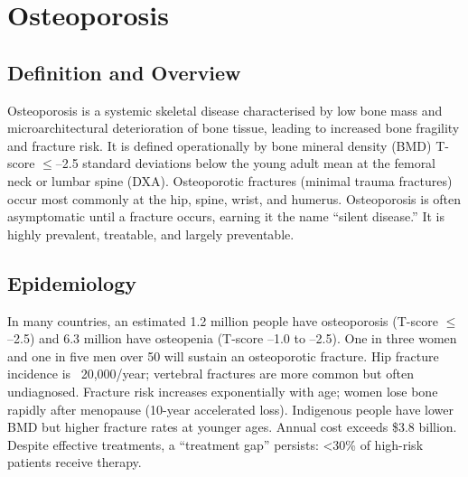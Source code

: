 \chapter{Osteoporosis}

\section*{Definition and Overview}
Osteoporosis is a systemic skeletal disease characterised by low bone mass and microarchitectural deterioration of bone tissue, leading to increased bone fragility and fracture risk. It is defined operationally by bone mineral density (BMD) T-score $\le$--2.5 standard deviations below the young adult mean at the femoral neck or lumbar spine (DXA). Osteoporotic fractures (minimal trauma fractures) occur most commonly at the hip, spine, wrist, and humerus. Osteoporosis is often asymptomatic until a fracture occurs, earning it the name ``silent disease.'' It is highly prevalent, treatable, and largely preventable.

\section*{Epidemiology}
In many countries, an estimated 1.2 million people have osteoporosis (T-score $\le$--2.5) and 6.3 million have osteopenia (T-score --1.0 to --2.5). One in three women and one in five men over 50 will sustain an osteoporotic fracture. Hip fracture incidence is ~20,000/year; vertebral fractures are more common but often undiagnosed. Fracture risk increases exponentially with age; women lose bone rapidly after menopause (10-year accelerated loss). Indigenous people have lower BMD but higher fracture rates at younger ages. Annual cost exceeds \$3.8 billion. Despite effective treatments, a ``treatment gap'' persists: <30\% of high-risk patients receive therapy.


